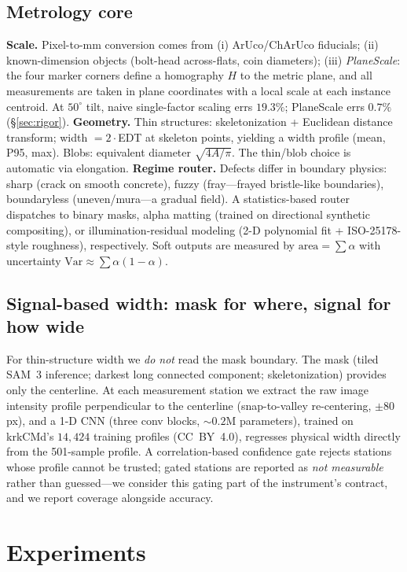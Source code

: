 \documentclass[11pt]{article}
\begin{document}
\subsection{Metrology core}
\textbf{Scale.} Pixel-to-mm conversion comes from (i) ArUco/ChArUco fiducials; (ii)
known-dimension objects (bolt-head across-flats, coin diameters); (iii) \emph{PlaneScale}:
the four marker corners define a homography $H$ to the metric plane, and all measurements
are taken in plane coordinates with a local scale at each instance centroid. At $50^\circ$
tilt, naive single-factor scaling errs $19.3\%$; PlaneScale errs $0.7\%$
(\S\ref{sec:rigor}).
\textbf{Geometry.} Thin structures: skeletonization + Euclidean distance transform; width
$=2\cdot$EDT at skeleton points, yielding a width profile (mean, P95, max). Blobs:
equivalent diameter $\sqrt{4A/\pi}$. The thin/blob choice is automatic via elongation.
\textbf{Regime router.} Defects differ in boundary physics: sharp (crack on smooth
concrete), fuzzy (fray---frayed bristle-like boundaries), boundaryless (uneven/mura---a
gradual field). A statistics-based router dispatches to binary masks, alpha matting
(trained on directional synthetic compositing), or illumination-residual modeling
(2-D polynomial fit + ISO-25178-style roughness), respectively. Soft outputs are measured
by $\mathrm{area}=\sum\alpha$ with uncertainty $\mathrm{Var}\approx\sum\alpha(1-\alpha)$.

\subsection{Signal-based width: mask for where, signal for how wide}\label{sec:signal-method}
For thin-structure width we \emph{do not} read the mask boundary. The mask (tiled SAM~3
inference; darkest long connected component; skeletonization) provides only the centerline.
At each measurement station we extract the raw image intensity profile perpendicular to the
centerline (snap-to-valley re-centering, $\pm80$\,px), and a 1-D CNN (three conv blocks,
${\sim}0.2$M parameters), trained on krkCMd's $14{,}424$ training profiles (CC~BY~4.0),
regresses physical width directly from the 501-sample profile. A correlation-based
confidence gate rejects stations whose profile cannot be trusted; gated stations are
reported as \emph{not measurable} rather than guessed---we consider this gating part of the
instrument's contract, and we report coverage alongside accuracy.

\section{Experiments}\label{sec:exp}
\end{document}
